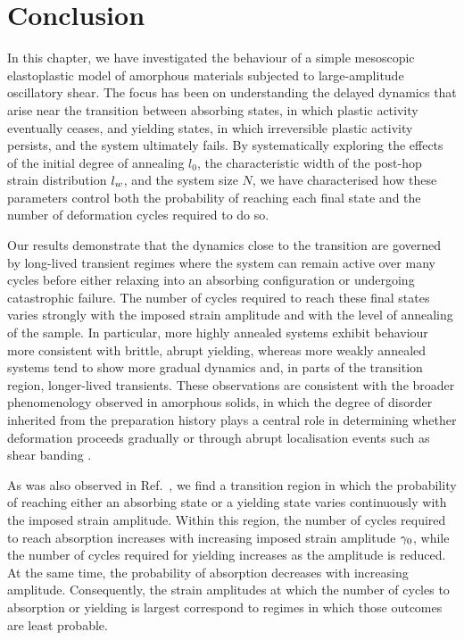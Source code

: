 \section{Conclusion} \label{sec:FatigueConclusion}

In this chapter, we have investigated the behaviour of a simple mesoscopic elastoplastic model of amorphous materials subjected to large-amplitude oscillatory shear. The focus has been on understanding the delayed dynamics that arise near the transition between absorbing states, in which plastic activity eventually ceases, and yielding states, in which irreversible plastic activity persists, and the system ultimately fails. By systematically exploring the effects of the initial degree of annealing $l_0$, the characteristic width of the post-hop strain distribution $l_w$, and the system size $N$, we have characterised how these parameters control both the probability of reaching each final state and the number of deformation cycles required to do so.

Our results demonstrate that the dynamics close to the transition are governed by long-lived transient regimes where the system can remain active over many cycles before either relaxing into an absorbing configuration or undergoing catastrophic failure. The number of cycles required to reach these final states varies strongly with the imposed strain amplitude and with the level of annealing of the sample. In particular, more highly annealed systems exhibit behaviour more consistent with brittle, abrupt yielding, whereas more weakly annealed systems tend to show more gradual dynamics and, in parts of the transition region, longer-lived transients. These observations are consistent with the broader phenomenology observed in amorphous solids, in which the degree of disorder inherited from the preparation history plays a central role in determining whether deformation proceeds gradually or through abrupt localisation events such as shear banding \cite{pollard_yielding_2022,liuFateShearoscillatedAmorphous2022,khandareElastoplasticModellingCyclic2026}.

As was also observed in Ref.~\cite{khandareElastoplasticModellingCyclic2026}, we find a transition region in which the probability of reaching either an absorbing state or a yielding state varies continuously with the imposed strain amplitude. Within this region, the number of cycles required to reach absorption increases with increasing imposed strain amplitude $\gamma_0$, while the number of cycles required for yielding increases as the amplitude is reduced. At the same time, the probability of absorption decreases with increasing amplitude. Consequently, the strain amplitudes at which the number of cycles to absorption or yielding is largest correspond to regimes in which those outcomes are least probable.

